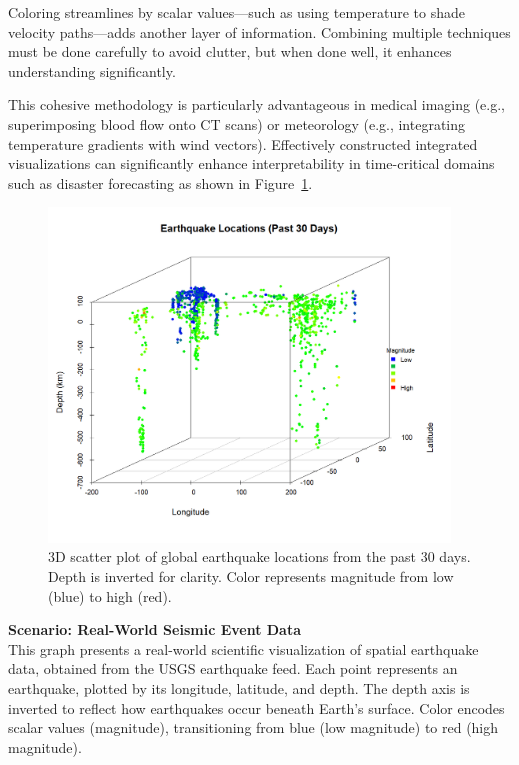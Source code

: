 \documentclass[11pt]{article}
\begin{document}
	Coloring streamlines by scalar values—such as using temperature to shade velocity paths—adds another layer of information. Combining multiple techniques must be done carefully to avoid clutter, but when done well, it enhances understanding significantly.

	This cohesive methodology is particularly advantageous in medical imaging (e.g., superimposing blood flow onto CT scans) or meteorology (e.g., integrating temperature gradients with wind vectors). Effectively constructed integrated visualizations can significantly enhance interpretability in time-critical domains such as disaster forecasting as shown in Figure~\ref{fig:earthquake_3d}.
	
		\begin{figure}[H]
		\centering
		\includegraphics[width=0.95\textwidth]{earthquake_3d_plot_with_legend.png}
		\caption{3D scatter plot of global earthquake locations from the past 30 days. Depth is inverted for clarity. Color represents magnitude from low (blue) to high (red).}
		\label{fig:earthquake_3d}
	\end{figure}
	
	\vspace{1em}
	\noindent
	\textbf{Scenario: Real-World Seismic Event Data} \\
	This graph presents a real-world scientific visualization of spatial earthquake data, obtained from the USGS earthquake feed. Each point represents an earthquake, plotted by its longitude, latitude, and depth. The depth axis is inverted to reflect how earthquakes occur beneath Earth's surface. Color encodes scalar values (magnitude), transitioning from blue (low magnitude) to red (high magnitude).
	
\end{document}
